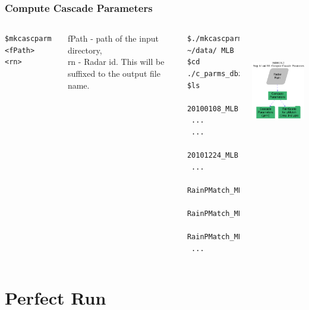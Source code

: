 \documentclass[aspectratio=169]{beamer}
\begin{document}
\begin{frame}[fragile]
\frametitle{Compute Cascade Parameters}
\begin{columns}
\begin{lstlisting}[style=BashInputStyle]
$mkcascparm <fPath> <rn>
\end{lstlisting}

fPath - path of the input directory,\\
rn - Radar id. This will be suffixed to the output file name.

\begin{lstlisting}[style=BashInputStyle]
$./mkcascparm ~/data/ MLB
$cd ./c_parms_dbz
$ls
 20100108_MLB.prm
 ...
 ...
 20101224_MLB.prm
 ...
 RainPMatch_MLB.ima  
 RainPMatch_MLB.ind  
 RainPMatch_MLB.pjn
 ...
\end{lstlisting}

	\includegraphics[height=2in]{../fig/casc_prm.pdf}
\end{columns}

\end{frame}
%
%
%
%
\section{Perfect Run}
\end{document}
